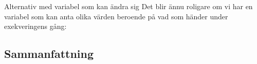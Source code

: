 \documentclass{lecturenotes}
\begin{document}
\begin{Slide}{Alternativ med variabel som kan ändra sig}
\footnotesize
Det blir ännu roligare om vi har en variabel som kan anta olika värden beroende på vad som händer under exekveringens gång:

\end{Slide}


		
\subsection{Sammanfattning}
\end{document}
